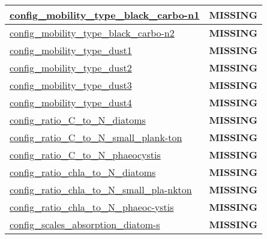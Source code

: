 {\begin{center}
\begin{longtable}{| p{2.0in} || p{4.0in} |}
    \hline
    \hyperref[subsec:nm_sec_config_mobility_type_black_carbon1]{config\_mobility\_type\_black\_carbo-}\hyperref[subsec:nm_sec_config_mobility_type_black_carbon1]{n1}& {\bf \color{red} MISSING} \\
    \hline
    \hyperref[subsec:nm_sec_config_mobility_type_black_carbon2]{config\_mobility\_type\_black\_carbo-}\hyperref[subsec:nm_sec_config_mobility_type_black_carbon2]{n2}& {\bf \color{red} MISSING} \\
    \hline
    \hyperref[subsec:nm_sec_config_mobility_type_dust1]{config\_mobility\_type\_dust1} & {\bf \color{red} MISSING} \\
    \hline
    \hyperref[subsec:nm_sec_config_mobility_type_dust2]{config\_mobility\_type\_dust2} & {\bf \color{red} MISSING} \\
    \hline
    \hyperref[subsec:nm_sec_config_mobility_type_dust3]{config\_mobility\_type\_dust3} & {\bf \color{red} MISSING} \\
    \hline
    \hyperref[subsec:nm_sec_config_mobility_type_dust4]{config\_mobility\_type\_dust4} & {\bf \color{red} MISSING} \\
    \hline
    \hyperref[subsec:nm_sec_config_ratio_C_to_N_diatoms]{config\_ratio\_C\_to\_N\_diatoms} & {\bf \color{red} MISSING} \\
    \hline
    \hyperref[subsec:nm_sec_config_ratio_C_to_N_small_plankton]{config\_ratio\_C\_to\_N\_small\_plank-}\hyperref[subsec:nm_sec_config_ratio_C_to_N_small_plankton]{ton}& {\bf \color{red} MISSING} \\
    \hline
    \hyperref[subsec:nm_sec_config_ratio_C_to_N_phaeocystis]{config\_ratio\_C\_to\_N\_phaeocystis} & {\bf \color{red} MISSING} \\
    \hline
    \hyperref[subsec:nm_sec_config_ratio_chla_to_N_diatoms]{config\_ratio\_chla\_to\_N\_diatoms} & {\bf \color{red} MISSING} \\
    \hline
    \hyperref[subsec:nm_sec_config_ratio_chla_to_N_small_plankton]{config\_ratio\_chla\_to\_N\_small\_pla-}\hyperref[subsec:nm_sec_config_ratio_chla_to_N_small_plankton]{nkton}& {\bf \color{red} MISSING} \\
    \hline
    \hyperref[subsec:nm_sec_config_ratio_chla_to_N_phaeocystis]{config\_ratio\_chla\_to\_N\_phaeoc-}\hyperref[subsec:nm_sec_config_ratio_chla_to_N_phaeocystis]{ystis}& {\bf \color{red} MISSING} \\
    \hline
    \hyperref[subsec:nm_sec_config_scales_absorption_diatoms]{config\_scales\_absorption\_diatom-}\hyperref[subsec:nm_sec_config_scales_absorption_diatoms]{s}& {\bf \color{red} MISSING} \\

\end{longtable}
\end{center}}
